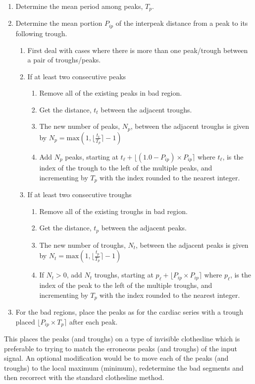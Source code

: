 \documentclass[twoside,twocolumn]{article}
\begin{document}
\begin{enumerate}
	\item Determine the mean period among peaks, $T_p$.
	\item Determine the mean portion $P_{ip}$ of the interpeak distance from a peak to its following trough.
	\begin{enumerate}
		\item First deal with cases where there is more than one peak/trough between a pair of troughs/peaks.
		\item If at least two consecutive peaks
		\begin{enumerate}
			\item Remove all of the existing peaks in bad region.
			\item Get the distance, $t_t$ between the adjacent troughs.
			\item The new number of peaks, $N_p$, between the adjacent troughs is given by $N_p = \text{max}(1, \lfloor \frac{t_t}{T_p} \rceil - 1)$ 
			\item Add $N_p$ peaks, starting at $t_{\ell} + \lfloor (1.0 - P_{ip}) \times P_{ip} \rceil$ where $t_{\ell}$, is the index of the trough to the left of the multiple peaks, and incrementing by $T_p$ with the index rounded to the nearest integer.
		\end{enumerate}
		\item If at least two consecutive troughs
		\begin{enumerate}
			\item Remove all of the existing troughs in bad region.
			\item Get the distance, $t_p$ between the adjacent peaks.
			\item The new number of troughs, $N_t$, between the adjacent peaks is given by $N_t = \text{max}(1, \lfloor \frac{t_p}{T_p} \rceil - 1)$ 
			\item If $N_t > 0$, add $N_t$ troughs, starting at $p_{\ell} + \lfloor P_{ip} \times P_{ip} \rceil$ where $p_{\ell}$, is the index of the peak to the left of the multiple troughs, and incrementing by $T_p$ with the index rounded to the nearest integer.
		\end{enumerate}
	\end{enumerate}
	\item For the bad regions, place the peaks as for the cardiac series with a trough placed $\lfloor P_{ip} \times T_p \rceil$ after each peak.
\end{enumerate}

This places the peaks (and troughs) on a type of invisible clothesline which is preferable to trying to match the erroneous peaks (and troughs) of the input signal.  An optional modification would be to move each of the peaks (and troughs) to the local maximum (minimum), redetermine the bad segments and then recorrect with the standard clothesline method.
\end{document}
